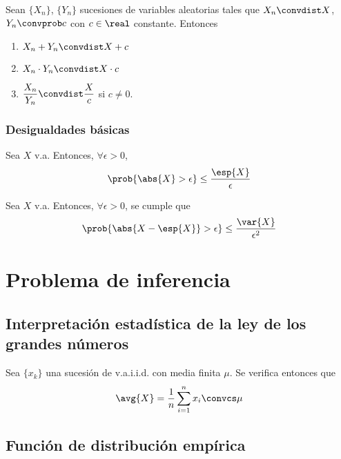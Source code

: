 \documentclass{apuntes}
\begin{document}
\newpage
\begin{theorem}\label{thmSlutsky} Sean $\{X_n\}$, $\{Y_n\}$ sucesiones de variables aleatorias tales que $X_n\convdist X$, $Y_n\convprob c$ con $c\in\real$ constante. Entonces

\begin{enumerate}
\item $X_n + Y_n \convdist X + c$
\item $X_n \cdot Y_n \convdist X \cdot c$
\item $\dfrac{X_n}{Y_n}\convdist \dfrac{X}{c}$ si $c≠0$.
\end{enumerate}
\end{theorem}

\subsubsection{Desigualdades básicas}

\begin{theorem}\label{desMarkov} Sea $X$ v.a. Entonces, $\forall \epsilon > 0$, \[ \prob{\abs{X} > \epsilon} \leq \frac{\esp{X}}{\epsilon} \]
\end{theorem}

\begin{theorem} Sea $X$ v.a. Entonces, $\forall \epsilon > 0$, se cumple que  \[ \prob{\abs{X - \esp{X}} > \epsilon} \leq \frac{\var {X}}{\epsilon^2} \]
\end{theorem}

\newpage
\section{Problema de inferencia}
\subsection{Interpretación estadística de la ley de los grandes números}

\begin{theorem} Sea $\{x_k\}$ una sucesión de v.a.i.i.d. con media finita $\mu$. Se verifica entonces que
\label{thmGrandes}
\[ \avg{X} = \frac{1}{n}\displaystyle\sum_{i=1}^n x_i \convcs \mu \]
\end{theorem}

\subsection{Función de distribución empírica}
\end{document}
